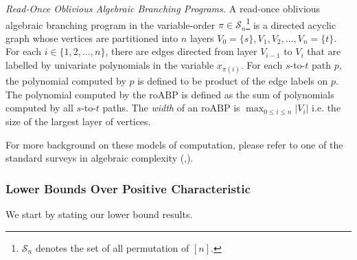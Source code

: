 \documentclass[11pt]{article}
\newtheorem{definition}[theorem]{Definition}
\newcommand{\roABP}{\mathrm{roABP}}
\begin{document}


\textit{Read-Once Oblivious Algebraic Branching Programs.}
    A read-once oblivious algebraic branching program in the variable-order $\pi \in \mathcal{S}_n$\footnote{$\mathcal{S}_n$ denotes the set of all permutation of $[n]$.} is a directed acyclic graph whose vertices are partitioned into $n$ layers $V_0 = \{s\}, V_1, V_2, \dots, V_n = \{t\}$. For each $i \in \{1, 2, \dots, n\}$, there are edges directed from layer $V_{i-1}$ to $V_{i}$ that are labelled by univariate polynomials in the variable $x_{\pi(i)}$. For each $s$-to-$t$ path $p$, the polynomial computed by $p$ is defined to be product of the edge labels on $p$. The polynomial computed by the $\roABP$ is defined as the sum of polynomials computed by all $s$-to-$t$ paths. The \emph{width} of an $\roABP$ is $\max_{0\leq i \leq n} |V_i|$ i.e. the size of the largest layer of vertices. 


For more background on these models of computation, please refer to one of the standard surveys in algebraic complexity (\cite{SY10},\cite{saptharishisurvey}).

\subsubsection{Lower Bounds Over Positive Characteristic}
\label{sec:intro-lower}

We start by stating our lower bound results. 
\end{document}
